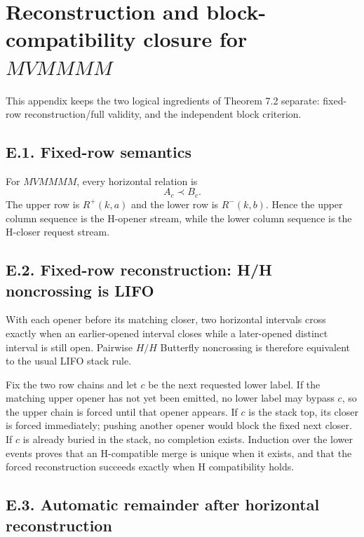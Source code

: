 \documentclass[11pt]{article}
\theoremstyle{definition}
\theoremstyle{remark}
\begin{document}
\appendix
\section{\texorpdfstring{Reconstruction and
block-compatibility closure for
\(MVMMMM\)}{Reconstruction and block-compatibility closure for MVMMMM}}\label{appendix-e.-reconstruction-and-block-compatibility-closure-for-mvmmmm}

This appendix keeps the two logical ingredients of Theorem 7.2 separate:
fixed-row reconstruction/full validity, and the independent block
criterion.

\subsection{E.1. Fixed-row semantics}\label{e.1.-fixed-row-semantics}

For \(MVMMMM\), every horizontal relation is \[
A_c\prec B_c.
\] The upper row is \(R^+(k,a)\) and the lower row is \(R^-(k,b)\).
Hence the upper column sequence is the H-opener stream, while the lower
column sequence is the H-closer request stream.

\subsection{E.2. Fixed-row reconstruction: H/H noncrossing is
LIFO}\label{e.2.-fixed-row-reconstruction-hh-noncrossing-is-lifo}

With each opener before its matching closer, two horizontal intervals
cross exactly when an earlier-opened interval closes while a
later-opened distinct interval is still open. Pairwise \(H/H\) Butterfly
noncrossing is therefore equivalent to the usual LIFO stack rule.

Fix the two row chains and let \(c\) be the next requested lower label.
If the matching upper opener has not yet been emitted, no lower label
may bypass \(c\), so the upper chain is forced until that opener
appears. If \(c\) is the stack top, its closer is forced immediately;
pushing another opener would block the fixed next closer. If \(c\) is
already buried in the stack, no completion exists. Induction over the
lower events proves that an H-compatible merge is unique when it exists,
and that the forced reconstruction succeeds exactly when H compatibility
holds.

\subsection{E.3. Automatic remainder after horizontal
reconstruction}\label{e.3.-automatic-remainder-after-horizontal-reconstruction}
\end{document}
